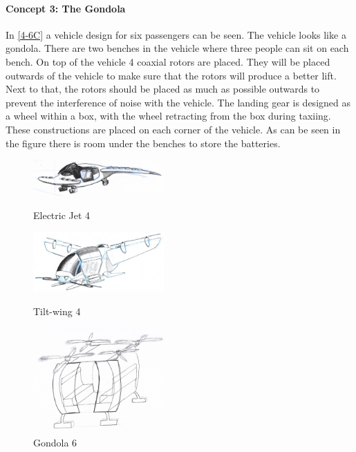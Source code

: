 \paragraph{Concept 3: The Gondola}
In \autoref{4-6C} a vehicle design for six passengers can be seen. The vehicle looks like a gondola. There are two benches in the vehicle where three people can sit on each bench. On top of the vehicle 4 coaxial rotors are placed. They will be placed outwards of the vehicle to make sure that the rotors will produce a better lift. Next to that, the rotors should be placed as much as possible outwards to prevent the interference of noise with the vehicle. The landing gear is designed as a wheel within a box, with the wheel retracting from the box during taxiing. These constructions are placed on each corner of the vehicle. As can be seen in the figure there is room under the benches to store the batteries. 
\begin{figure}[H]
  \centering
  \begin{minipage}[b]{0.25\textwidth}
    \includegraphics[width=5.0cm]{./Figures/ejet.jpg}
    \captionsetup{justification=centering}
    \caption{Electric Jet 4}
    \label{4-6A}
  \end{minipage}
  \hspace{1.5cm}
  \begin{minipage}[b]{0.30\textwidth}
    \includegraphics[width=5.0cm]{./Figures/bumblebee.jpg}
    \captionsetup{justification=centering}
    \caption{Tilt-wing 4}
    \label{4-6B}
  \end{minipage}
  \hspace{0.5cm}
  \begin{minipage}[b]{0.25\textwidth}
    \includegraphics[width=5.0cm]{./Figures/carriage.jpg}
    \captionsetup{justification=centering}
    \caption{Gondola 6}
    \label{4-6C}
  \end{minipage}  
\end{figure}


